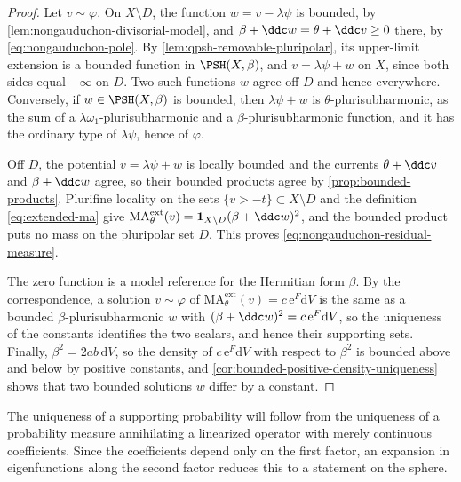 \begin{proof}
Let $v\sim\varphi$. On $X\setminus D$, the function $w=v-\lambda\psi$ is bounded, by \cref{lem:nongauduchon-divisorial-model}, and $\beta+\ddc w=\theta+\ddc v\geq0$ there, by \eqref{eq:nongauduchon-pole}. By \cref{lem:qpsh-removable-pluripolar}, its upper-limit extension is a bounded function in $\PSH(X,\beta)$, and $v=\lambda\psi+w$ on $X$, since both sides equal $-\infty$ on $D$. Two such functions $w$ agree off $D$ and hence everywhere. Conversely, if $w\in\PSH(X,\beta)$ is bounded, then $\lambda\psi+w$ is $\theta$-plurisubharmonic, as the sum of a $\lambda\omega_1$-plurisubharmonic and a $\beta$-plurisubharmonic function, and it has the ordinary type of $\lambda\psi$, hence of $\varphi$.

Off $D$, the potential $v=\lambda\psi+w$ is locally bounded and the currents $\theta+\ddc v$ and $\beta+\ddc w$ agree, so their bounded products agree by \cref{prop:bounded-products}. Plurifine locality on the sets $\{v>-t\}\subset X\setminus D$ and the definition \eqref{eq:extended-ma} give $\mathrm{MA}^{\mathrm{ext}}_\theta(v)=\mathbf 1_{X\setminus D}(\beta+\ddc w)^2$, and the bounded product puts no mass on the pluripolar set $D$. This proves \eqref{eq:nongauduchon-residual-measure}.

The zero function is a model reference for the Hermitian form $\beta$. By the correspondence, a solution $v\sim\varphi$ of $\mathrm{MA}^{\mathrm{ext}}_\theta(v)=c\,\mathrm e^F\mathrm dV$ is the same as a bounded $\beta$-plurisubharmonic $w$ with $(\beta+\ddc w)^2=c\,\mathrm e^F\mathrm dV$, so the uniqueness of the constants identifies the two scalars, and hence their supporting sets. Finally, $\beta^2=2ab\,\mathrm dV$, so the density of $c\,\mathrm e^F\mathrm dV$ with respect to $\beta^2$ is bounded above and below by positive constants, and \cref{cor:bounded-positive-density-uniqueness} shows that two bounded solutions $w$ differ by a constant.
\end{proof}

The uniqueness of a supporting probability will follow from the uniqueness of a probability measure annihilating a linearized operator with merely continuous coefficients. Since the coefficients depend only on the first factor, an expansion in eigenfunctions along the second factor reduces this to a statement on the sphere.

